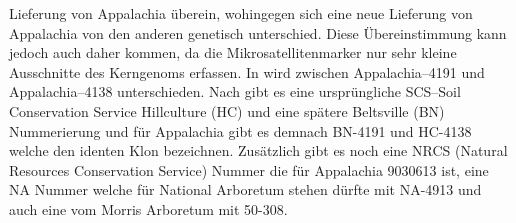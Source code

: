 \documentclass[twocolumn]{scrartcl}
\begin{document}
Lieferung von Appalachia überein, wohingegen sich eine neue Lieferung
von Appalachia von den anderen genetisch unterschied. Diese
Übereinstimmung kann jedoch auch daher kommen, da die
Mikrosatellitenmarker nur sehr kleine Ausschnitte des Kerngenoms
erfassen. In \cite{liesebach2021robinie} wird zwischen
Appalachia--4191 und Appalachia--4138 unterschieden. Nach
\cite{steinergroup1987robinie} gibt es eine ursprüngliche SCS--Soil
Conservation Service Hillculture (HC) und eine spätere Beltsville (BN)
Nummerierung und für Appalachia gibt es demnach BN-4191 und HC-4138
welche den identen Klon bezeichnen. Zusätzlich gibt es noch eine NRCS
(Natural Resources Conservation Service) Nummer die für Appalachia
9030613 ist, eine NA Nummer welche für National Arboretum stehen
dürfte mit NA-4913 und auch eine vom Morris Arboretum mit 50-308.
\end{document}
